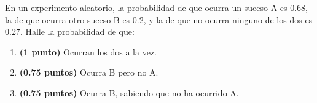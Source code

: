 
En un experimento aleatorio, la probabilidad de que ocurra un suceso A es 0.68, la de que ocurra otro suceso B es 0.2, y la de que no ocurra ninguno de los dos es 0.27. Halle la probabilidad de que:
\begin{enumerate}[label=\alph*)]
\item \textbf{(1 punto)} Ocurran los dos a la vez.
\item \textbf{(0.75 puntos)} Ocurra B pero no A.
\item \textbf{(0.75 puntos)} Ocurra B, sabiendo que no ha ocurrido A.
\end{enumerate}
